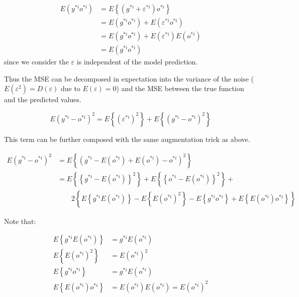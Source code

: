 \documentclass[runningheads,openany]{xhlPaper}
\begin{document}
\begin{displaymath}
\begin{aligned}
E\left ( y^{*i}o^{*i} \right )&=E\left \{ \left ( g^{*i}+\varepsilon^{*i} \right )o^{*i} \right \}\\
&=E\left (g^{*i}o^{*i} \right )+E\left ( \varepsilon^{*i} o^{*i} \right )\\
&=E\left (g^{*i}o^{*i} \right )+E\left ( \varepsilon^{*i} \right )E\left ( o^{*i} \right )\\
&=E\left (g^{*i}o^{*i} \right )
\end{aligned}
\end{displaymath}
since we consider the $\varepsilon$ is independent of the model prediction.

Thus the MSE can be decomposed in expectation into the variance of the noise ($E\left ( \varepsilon^2  \right ) = D\left ( \varepsilon  \right )$ due to $E\left ( \varepsilon  \right )=0$) and the MSE between the true function and the predicted values.

\begin{displaymath}
E\left ( y^{*i}-o^{*i} \right )^2 = E\left \{ \left(\varepsilon^{*i}\right)^2  \right \} +E\left \{\left ( g^{*i}-o^{*i} \right )^2\right \}
\end{displaymath}

This term can be further composed with the same augmentation trick as above.

\begin{displaymath}
\begin{aligned}
E\left ( g^{*i}-o^{*i} \right )^2 &= E\left \{\left ( g^{*i} - E\left ( o^{*i} \right )+E\left ( o^{*i} \right ) - o^{*i}\right )^2 \right \}\\
&=E\left \{ \left \{ g^{*i} - E\left ( o^{*i} \right ) \right \}^2 \right \}+E\left \{ \left \{ o^{*i} - E\left ( o^{*i} \right ) \right \}^2 \right \}+\\
&\quad\quad 2\left \{ E\left \{ g^{*i}E\left ( o^{*i} \right ) \right \} - E\left \{ E\left ( o^{*i} \right )^2 \right \} - E\left \{ g^{*i}o^{*i} \right \}+ E\left \{ E\left ( o^{*i} \right )o^{*i} \right \}\right \}
\end{aligned}
\end{displaymath}

Note that:

\begin{displaymath}
\begin{aligned}
E\left \{ g^{*i}E\left ( o^{*i} \right ) \right \}&=g^{*i}E\left ( o^{*i} \right )\\
E\left \{ E\left ( o^{*i} \right )^2 \right \}&=E\left ( o^{*i} \right )^2\\
E\left \{ g^{*i}o^{*i} \right \}&=g^{*i}E\left ( o^{*i} \right )\\
E\left \{ E\left ( o^{*i} \right )o^{*i} \right \}&=E\left ( o^{*i} \right )E\left ( o^{*i} \right )
=E\left ( o^{*i} \right )^2
\end{aligned}
\end{displaymath}
\end{document}
